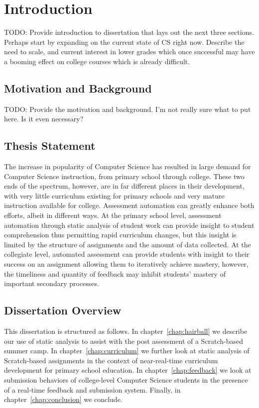 \chapter{Introduction}
TODO: Provide introduction to dissertation that lays out the next three
sections. Perhaps start by expanding on the current state of CS right
now. Describe the need to scale, and current interest in lower grades which
once successful may have a booming effect on college courses which is already
difficult.

\section{Motivation and Background}
TODO: Provide the motivation and background. I'm not really sure what to put
here. Is it even necessary?

\section{Thesis Statement}
The increase in popularity of Computer Science has resulted in large demand for
Computer Science instruction, from primary school through college. These two
ends of the spectrum, however, are in far different places in their
development, with very little curriculum existing for primary schools and very
mature instruction available for college. Assessment automation can greatly
enhance both efforts, albeit in different ways. At the primary school level,
assessment automation through static analysis of student work can provide
insight to student comprehension thus permitting rapid curriculum changes, but
this insight is limited by the structure of assignments and the amount of data
collected. At the collegiate level, automated assessment can provide students
with insight to their success on an assignment allowing them to iteratively
achieve mastery, however, the timeliness and quantity of feedback may inhibit
students' mastery of important secondary processes.

\section{Dissertation Overview}
This dissertation is structured as follows. In chapter~\ref{chap:hairball} we
describe our use of static analysis to assist with the post assessment of a
Scratch-based summer camp. In chapter~\ref{chap:curriculum} we further look at
static analysis of Scratch-based assignments in the context of near-real-time
curriculum development for primary school education. In
chapter~\ref{chap:feedback} we look at submission behaviors of college-level
Computer Science students in the presence of a real-time feedback and
submission system. Finally, in chapter~\ref{chap:conclusion} we conclude.
